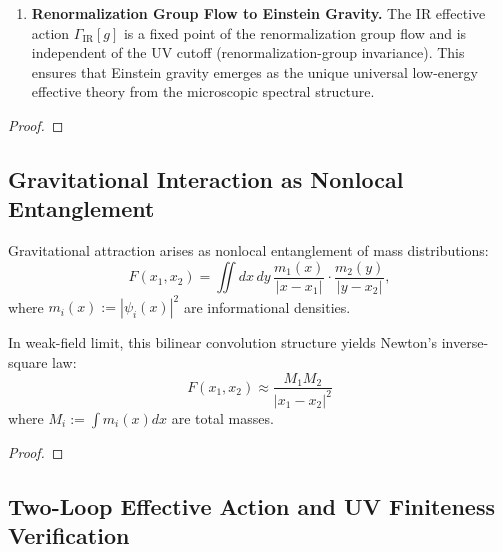 \begin{theorem}
\begin{enumerate}[label=(\roman*)]
\item \textbf{Renormalization Group Flow to Einstein Gravity.} The IR effective action $\Gamma_{\text{IR}}[g]$ is a fixed point of the renormalization group flow and is independent of the UV cutoff (renormalization-group invariance). This ensures that Einstein gravity emerges as the unique universal low-energy effective theory from the microscopic spectral structure.

\end{enumerate}

\begin{proof}

\end{proof}

\end{theorem}

\subsection{Gravitational Interaction as Nonlocal Entanglement}
\label{subsec:gravitationalInteractionAsNonlocalEntanglement}

\begin{theorem}
\label{thm:gravitationalConvolution}
Gravitational attraction arises as nonlocal entanglement of mass distributions:
\begin{equation}
F(x_1, x_2) = \iint dx \, dy \, \frac{m_1(x)}{|x - x_1|} \cdot \frac{m_2(y)}{|y - x_2|},
\end{equation}
where $m_i(x) := |\psi_i(x)|^2$ are informational densities.

In weak-field limit, this bilinear convolution structure yields Newton's inverse-square law:
\begin{equation}
F(x_1, x_2) \approx \frac{M_1 M_2}{|x_1 - x_2|^2}
\end{equation}
where $M_i := \int m_i(x) dx$ are total masses.

\begin{proof}

\end{proof}
\end{theorem}

\subsection{Two-Loop Effective Action and UV Finiteness Verification}
\label{subsec:twoLoopUVFiniteness}

